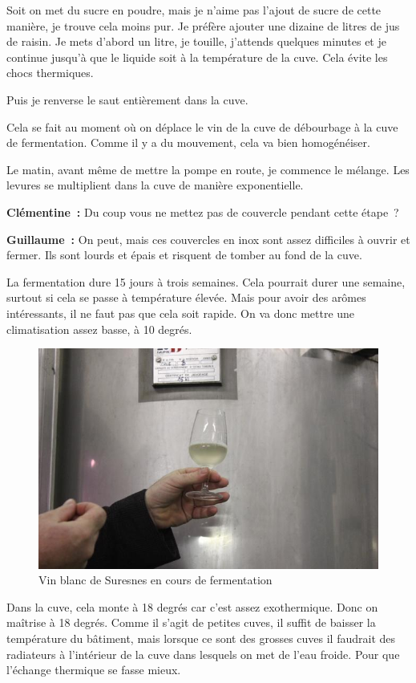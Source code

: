 \documentclass[a4paper, titlepage]{report}
\begin{document}
Soit on met du sucre en poudre, mais je n'aime pas l'ajout de sucre de
cette manière, je trouve cela moins pur. Je préfère ajouter une dizaine
de litres de jus de raisin. Je mets d'abord un litre, je touille,
j'attends quelques minutes et je continue jusqu'à que le liquide soit à
la température de la cuve. Cela évite les chocs thermiques.

Puis je renverse le saut entièrement dans la cuve.

Cela se fait au moment où on déplace le vin de la cuve de débourbage à
la cuve de fermentation. Comme il y a du mouvement, cela va bien
homogénéiser.

Le matin, avant même de mettre la pompe en route, je commence le
mélange. Les levures se multiplient dans la cuve de manière
exponentielle.

\textbf{Clémentine~:} Du coup vous ne mettez pas de couvercle pendant
cette étape~?

\textbf{Guillaume~:} On peut, mais ces couvercles en inox sont assez
difficiles à ouvrir et fermer. Ils sont lourds et épais et risquent de
tomber au fond de la cuve.

La fermentation dure 15 jours à trois semaines. Cela pourrait durer une
semaine, surtout si cela se passe à température élevée. Mais pour avoir
des arômes intéressants, il ne faut pas que cela soit rapide. On va donc
mettre une climatisation assez basse, à 10 degrés.

\begin{figure}[!h]
\includegraphics{Images/vin.jpg}
\caption{Vin blanc de Suresnes en cours de fermentation}
\end{figure}


Dans la cuve, cela monte à 18 degrés car
c'est assez exothermique. Donc on maîtrise à 18 degrés. Comme il s'agit
de petites cuves, il suffit de baisser la température du bâtiment, mais
lorsque ce sont des grosses cuves il faudrait des radiateurs à
l'intérieur de la cuve dans lesquels on met de l'eau froide. Pour que
l'échange thermique se fasse mieux.
\end{document}
